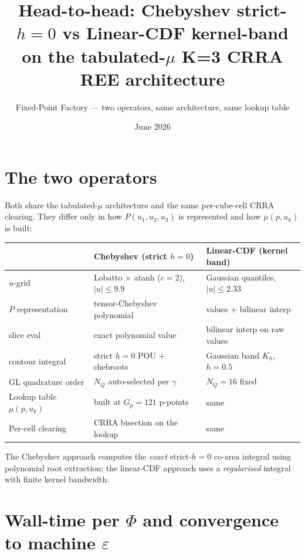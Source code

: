 \documentclass[11pt]{article}
\title{Head-to-head: Chebyshev strict-$h{=}0$ vs Linear-CDF kernel-band\\
       on the tabulated-$\mu$ K=3 CRRA REE architecture}
\author{Fixed-Point Factory --- two operators, same architecture, same lookup table}
\date{June 2026}
\begin{document}
\maketitle

\section*{The two operators}

Both share the tabulated-$\mu$ architecture and the same per-cube-cell CRRA
clearing. They differ only in how $P(u_1,u_2,u_3)$ is represented and how
$\mu(p, u_k)$ is built:

\begin{center}
\begin{tabular}{lll}
\toprule
& \textbf{Chebyshev (strict $h{=}0$)} & \textbf{Linear-CDF (kernel band)} \\
\midrule
$u$-grid                 & Lobatto $\times$ atanh ($c{=}2$), $|u|\!\leq\!9.9$
                         & Gaussian quantiles, $|u|\!\leq\!2.33$ \\
$P$ representation       & tensor-Chebyshev polynomial
                         & values + bilinear interp \\
slice eval               & exact polynomial value
                         & bilinear interp on raw values \\
contour integral         & strict $h{=}0$ POU + chebroots
                         & Gaussian band $K_h$, $h=0.5$ \\
GL quadrature order      & $N_Q$ auto-selected per $\gamma$
                         & $N_Q=16$ fixed \\
Lookup table $\mu(p,u_k)$ & built at $G_p=121$ p-points
                         & same \\
Per-cell clearing         & CRRA bisection on the lookup
                         & same \\
\bottomrule
\end{tabular}
\end{center}

\noindent
The Chebyshev approach computes the \emph{exact} strict-$h{=}0$ co-area
integral using polynomial root extraction; the linear-CDF approach uses
a \emph{regularised} integral with finite kernel bandwidth.

\section{Wall-time per $\Phi$ and convergence to machine $\varepsilon$}
\end{document}
